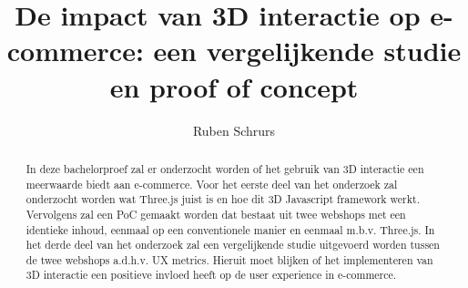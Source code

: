 \documentclass{hogent-article}
\title{De impact van 3D interactie op e-commerce: een vergelijkende studie en proof of concept}
\author{Ruben Schrurs}
\begin{document}
\begin{abstract}
 In deze bachelorproef zal er onderzocht worden of het gebruik van 3D interactie een meerwaarde biedt aan e-commerce. Voor het eerste deel van het onderzoek zal onderzocht worden wat Three.js juist is en hoe dit 3D Javascript framework werkt. Vervolgens zal een PoC gemaakt worden dat bestaat uit twee webshops met een identieke inhoud, eenmaal op een conventionele manier en eenmaal m.b.v. Three.js. In het derde deel van het onderzoek zal een vergelijkende studie uitgevoerd worden tussen de twee webshops a.d.h.v. UX metrics. Hieruit moet blijken of het implementeren van 3D interactie een positieve invloed heeft op de user experience in e-commerce.
\end{abstract}

\tableofcontents



\printbibliography[heading=bibintoc]
\end{document}
